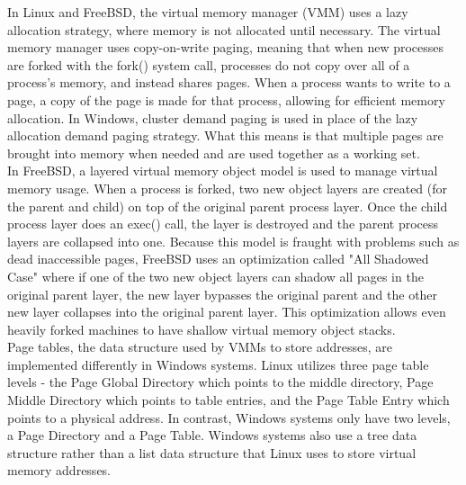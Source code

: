 \documentclass[journal, letterpaper, draftclsnofoot, onecolumn, 10pt]{IEEEtran}
\begin{document}
In Linux and FreeBSD, the virtual memory manager (VMM) uses a lazy allocation strategy, where memory is not allocated until necessary. The virtual memory manager uses copy-on-write paging, meaning that when new processes are forked with the fork() system call, processes do not copy over all of a process's memory, and instead shares pages. When a process wants to write to a page, a copy of the page is made for that process, allowing for efficient memory allocation.
In Windows, cluster demand paging is used in place of the lazy allocation demand paging strategy. What this means is that multiple pages are brought into memory when needed and are used together as a working set. \\


In FreeBSD, a layered virtual memory object model is used to manage virtual memory usage. When a process is forked, two new object layers are created (for the parent and child) on top of the original parent process layer. Once the child process layer does an exec() call, the layer is destroyed and the parent process layers are collapsed into one.
Because this model is fraught with problems such as dead inaccessible pages, FreeBSD uses an optimization called "All Shadowed Case" where if one of the two new object layers can shadow all pages in the original parent layer, the new layer bypasses the original parent and the other new layer collapses into the original parent layer. This optimization allows even heavily forked machines to have shallow virtual memory object stacks.\\

Page tables, the data structure used by VMMs to store addresses, are implemented differently in Windows systems. Linux utilizes three page table levels - the Page Global Directory which points to the middle directory, Page Middle Directory which points to table entries, and the Page Table Entry which points to a physical address. In contrast, Windows systems only have two levels, a Page Directory and a Page Table.
Windows systems also use a tree data structure rather than a list data structure that Linux uses to store virtual memory addresses. \\
\end{document}

